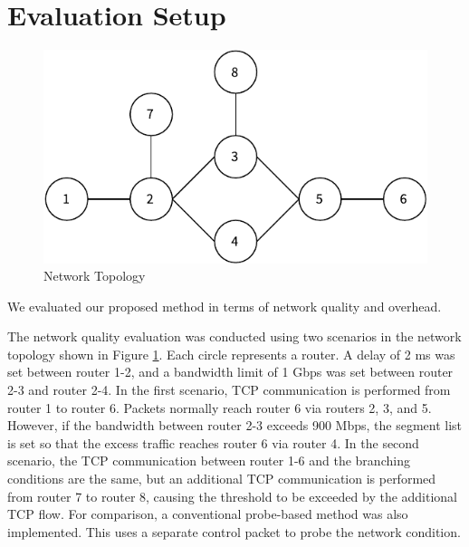 \documentclass[conference]{IEEEtran}
\begin{document}
\section{Evaluation Setup}

\begin{figure}[t]
  \centering
  \includegraphics[width=0.7\linewidth]{./figures/topo.pdf}
  \caption{Network Topology}
  \label{fig:network-topology}
\end{figure}



We evaluated our proposed method in terms of network quality and overhead.

The network quality evaluation was conducted using two scenarios in the network topology shown in Figure \ref{fig:network-topology}.
Each circle represents a router. A delay of 2 ms was set between router 1-2, and a bandwidth limit of 1 Gbps was set between router 2-3 and router 2-4.
In the first scenario, TCP communication is performed from router 1 to router 6.
Packets normally reach router 6 via routers 2, 3, and 5. However, if the bandwidth between router 2-3 exceeds 900 Mbps, the segment list is set so that the excess traffic reaches router 6 via router 4.
In the second scenario, the TCP communication between router 1-6 and the branching conditions are the same, but an additional TCP communication is performed from router 7 to router 8, causing the threshold to be exceeded by the additional TCP flow.
For comparison, a conventional probe-based method was also implemented. This uses a separate control packet to probe the network condition.
\end{document}
